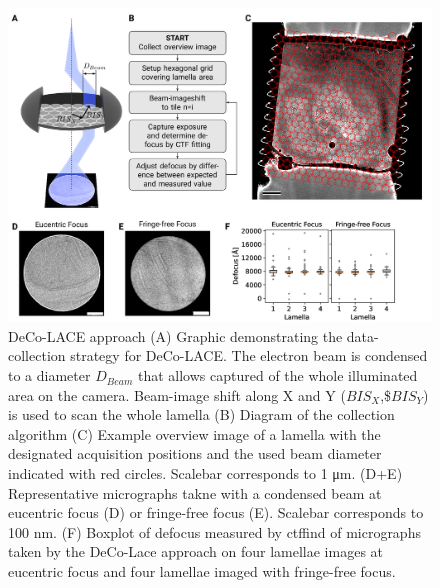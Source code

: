 \documentclass[
]{article}
\begin{document}
\begin{figure}
\hypertarget{fig:approach}{%
\centering
\includegraphics{figures/approach.png}
\caption{DeCo-LACE approach (A) Graphic demonstrating the data-collection strategy for
DeCo-LACE. The electron beam is condensed to a diameter \(D_{Beam}\) that allows captured of
the whole illuminated area on the camera. Beam-image shift along X and Y
(\(BIS_X\),\$\(BIS_Y\)) is used to scan the whole lamella
(B) Diagram of the collection algorithm
(C) Example overview image of a lamella with the designated acquisition
positions and the used beam diameter indicated with red circles. Scalebar corresponds to 1 μm.
(D+E) Representative micrographs takne with a condensed beam at eucentric focus
(D) or fringe-free focus (E). Scalebar corresponds to 100 nm.
(F) Boxplot of defocus measured by ctffind of micrographs taken by the DeCo-Lace
approach on four lamellae images at eucentric focus and four lamellae imaged with
fringe-free focus.}\label{fig:approach}
}
\end{figure}
\end{document}
